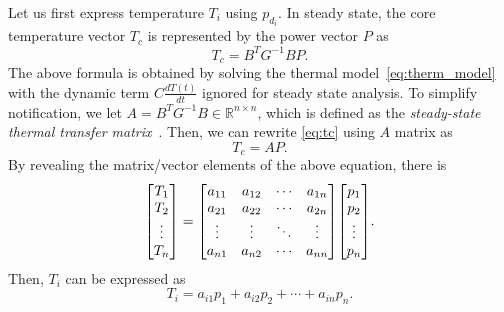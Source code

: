 Let us first express temperature $T_i$ using $p_{d_i}$. In steady
state, the core temperature vector 
$T_c$ is represented by the power vector $P$ as 
\begin{equation}\label{eq:tc}
T_{c} = B^{T}G^{-1}BP.
\end{equation}
The above formula is obtained by solving the thermal
model~\eqref{eq:therm_model} with the dynamic term $C\frac{dT(t)}{dt}$ ignored
for steady state analysis.
To simplify notification, we let $A = B^{T}G^{-1}B \in \mathbb{R}^{n
  \times n}$, which is defined as the \emph{steady-state thermal
  transfer matrix}~\cite{Reda:SJ'18}.
Then, we can rewrite \eqref{eq:tc} using $A$ matrix as
\begin{equation}\label{eq:sim_tc}
  T_{c} = AP.
\end{equation}
By revealing the matrix/vector elements of the above equation, there is
\begin{equation}
{\left[
\begin{matrix}
 T_{1}   \\
 T_{2}   \\
 \vdots  \\
 T_{n}   \\
\end{matrix}
\right]}
=
{\left[
\begin{matrix}
 a_{11} & a_{12} & \cdots & a_{1n} \\
 a_{21} & a_{22} & \cdots & a_{2n} \\
 \vdots & \vdots & \ddots & \vdots \\
 a_{n1} & a_{n2} & \cdots & a_{nn} \\
\end{matrix}
\right]}
{\left[
\begin{matrix}
 p_{1}   \\
 p_{2}   \\
 \vdots  \\
 p_{n}   \\
\end{matrix}
\right]}.\\
\end{equation}
Then, $T_{i}$ can be expressed as
\begin{equation}\label{eq:ti}
T_{i} =a_{i1}p_{1} + a_{i2}p_{2} +\cdots + a_{in}p_{n}. 
\end{equation}


